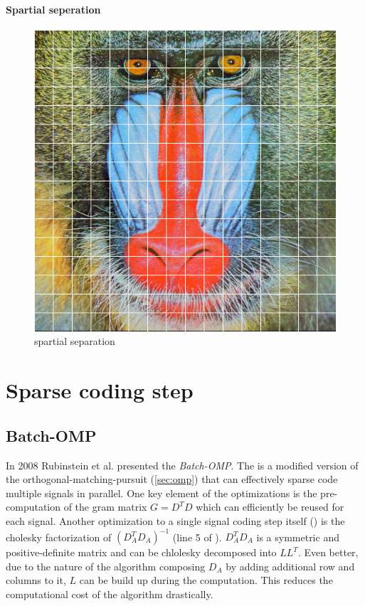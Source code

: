 \paragraph{Spartial seperation}

\begin{figure}[h]
\centering
\includegraphics[scale = 0.25]{images/segmentation.png}
\caption{spartial separation}
\label{fig:spartial}
\end{figure}

\section{Sparse coding step}
\subsection{Batch-OMP}
In 2008 Rubinstein et al.\cite{Rubinstein2008} presented the \emph{Batch-OMP}.
The
 is a modified version of the
orthogonal-matching-pursuit (\ref{sec:omp}) that can effectively sparse code
multiple signals in parallel. One key element of the optimizations is the
pre-computation of the gram matrix $G=D^TD$ which can efficiently be reused
for each signal. Another optimization to a single signal coding step itself
() is the cholesky factorization of $\left( D_A^T D_A
\right)^{-1}$ (line 5 of ). $D_A^T
D_A$ is a symmetric and positive-definite matrix and can be chlolesky decomposed
into $LL^T$. Even better, due to the nature of the algorithm composing $D_A$
by adding additional row and columns to it, $L$ can be build up during the
computation. This reduces the computational cost of the algorithm drastically.
 
